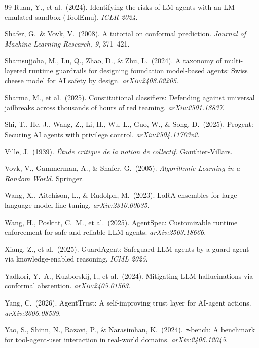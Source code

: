 \documentclass[10pt,twocolumn]{article}
\begin{document}
\begin{thebibliography}{99}
Ruan, Y., et al.\ (2024).
Identifying the risks of LM agents with an LM-emulated sandbox (ToolEmu).
\emph{ICLR 2024}.

Shafer, G.\ \& Vovk, V.\ (2008).
A tutorial on conformal prediction.
\emph{Journal of Machine Learning Research, 9}, 371--421.

Shamsujjoha, M., Lu, Q., Zhao, D., \& Zhu, L.\ (2024).
A taxonomy of multi-layered runtime guardrails for designing foundation
model-based agents: Swiss cheese model for AI safety by design.
\emph{arXiv:2408.02205}.

Sharma, M., et al.\ (2025).
Constitutional classifiers: Defending against universal jailbreaks across
thousands of hours of red teaming.
\emph{arXiv:2501.18837}.

Shi, T., He, J., Wang, Z., Li, H., Wu, L., Guo, W., \& Song, D.\ (2025).
Progent: Securing AI agents with privilege control.
\emph{arXiv:2504.11703v2}.

Ville, J.\ (1939).
\emph{\'Etude critique de la notion de collectif.}
Gauthier-Villars.

Vovk, V., Gammerman, A., \& Shafer, G.\ (2005).
\emph{Algorithmic Learning in a Random World.}
Springer.

Wang, X., Aitchison, L., \& Rudolph, M.\ (2023).
LoRA ensembles for large language model fine-tuning.
\emph{arXiv:2310.00035}.

Wang, H., Poskitt, C.~M., et al.\ (2025).
AgentSpec: Customizable runtime enforcement for safe and reliable LLM
agents.
\emph{arXiv:2503.18666}.

Xiang, Z., et al.\ (2025).
GuardAgent: Safeguard LLM agents by a guard agent via knowledge-enabled
reasoning.
\emph{ICML 2025}.

Yadkori, Y.~A., Kuzborskij, I., et al.\ (2024).
Mitigating LLM hallucinations via conformal abstention.
\emph{arXiv:2405.01563}.

Yang, C.\ (2026).
AgentTrust: A self-improving trust layer for AI-agent actions.
\emph{arXiv:2606.08539}.

Yao, S., Shinn, N., Razavi, P., \& Narasimhan, K.\ (2024).
$\tau$-bench: A benchmark for tool-agent-user interaction in real-world
domains.
\emph{arXiv:2406.12045}.


\end{thebibliography}
\end{document}
